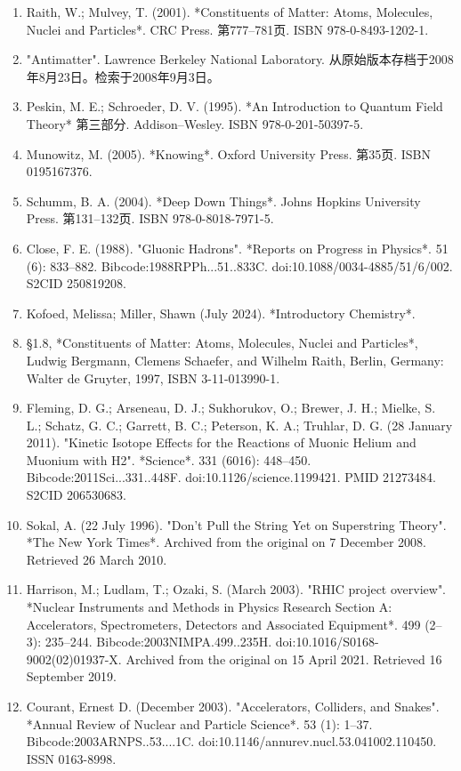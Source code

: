 \begin{enumerate}
\item Raith, W.; Mulvey, T. (2001). *Constituents of Matter: Atoms, Molecules, Nuclei and Particles*. CRC Press. 第777–781页. ISBN 978-0-8493-1202-1.
\item "Antimatter". Lawrence Berkeley National Laboratory. 从原始版本存档于2008年8月23日。检索于2008年9月3日。
\item Peskin, M. E.; Schroeder, D. V. (1995). *An Introduction to Quantum Field Theory* 第三部分. Addison–Wesley. ISBN 978-0-201-50397-5.
\item Munowitz, M. (2005). *Knowing*. Oxford University Press. 第35页. ISBN 0195167376.
\item Schumm, B. A. (2004). *Deep Down Things*. Johns Hopkins University Press. 第131–132页. ISBN 978-0-8018-7971-5.
\item Close, F. E. (1988). "Gluonic Hadrons". *Reports on Progress in Physics*. 51 (6): 833–882. Bibcode:1988RPPh...51..833C. doi:10.1088/0034-4885/51/6/002. S2CID 250819208.
\item Kofoed, Melissa; Miller, Shawn (July 2024). *Introductory Chemistry*.
\item §1.8, *Constituents of Matter: Atoms, Molecules, Nuclei and Particles*, Ludwig Bergmann, Clemens Schaefer, and Wilhelm Raith, Berlin, Germany: Walter de Gruyter, 1997, ISBN 3-11-013990-1.
\item Fleming, D. G.; Arseneau, D. J.; Sukhorukov, O.; Brewer, J. H.; Mielke, S. L.; Schatz, G. C.; Garrett, B. C.; Peterson, K. A.; Truhlar, D. G. (28 January 2011). "Kinetic Isotope Effects for the Reactions of Muonic Helium and Muonium with H2". *Science*. 331 (6016): 448–450. Bibcode:2011Sci...331..448F. doi:10.1126/science.1199421. PMID 21273484. S2CID 206530683.
\item Sokal, A. (22 July 1996). "Don't Pull the String Yet on Superstring Theory". *The New York Times*. Archived from the original on 7 December 2008. Retrieved 26 March 2010.
\item Harrison, M.; Ludlam, T.; Ozaki, S. (March 2003). "RHIC project overview". *Nuclear Instruments and Methods in Physics Research Section A: Accelerators, Spectrometers, Detectors and Associated Equipment*. 499 (2–3): 235–244. Bibcode:2003NIMPA.499..235H. doi:10.1016/S0168-9002(02)01937-X. Archived from the original on 15 April 2021. Retrieved 16 September 2019.
\item Courant, Ernest D. (December 2003). "Accelerators, Colliders, and Snakes". *Annual Review of Nuclear and Particle Science*. 53 (1): 1–37. Bibcode:2003ARNPS..53....1C. doi:10.1146/annurev.nucl.53.041002.110450. ISSN 0163-8998.

\end{enumerate}
